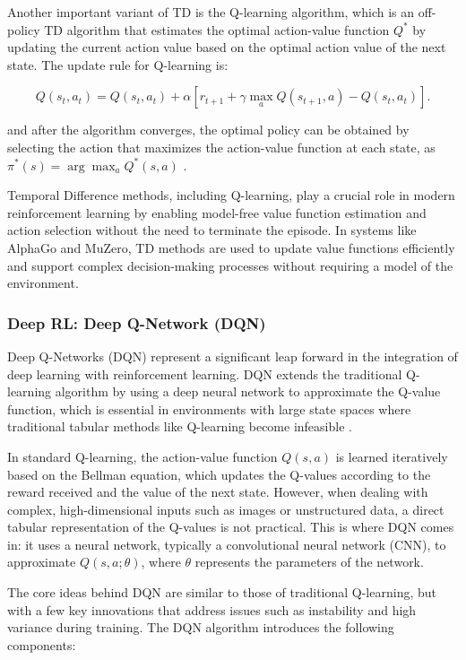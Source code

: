 Another important variant of TD is the Q-learning algorithm, which is an
off-policy TD algorithm that estimates the optimal action-value function $Q^*$
by updating the current action value based on the optimal action value of the
next state. The update rule for Q-learning is:

\begin{equation}
    Q(s_t, a_t) = Q(s_t, a_t) + \alpha[r_{t+1} + \gamma \max_a Q(s_{t+1}, a) - Q(s_t, a_t)] .
\end{equation}

and after the algorithm converges, the optimal policy can be obtained by
selecting the action that maximizes the action-value function at each state, as
$\pi^*(s) = \arg\max_a Q^*(s, a)$ \cite{bg2}.

Temporal Difference methods, including Q-learning, play a crucial role in
modern reinforcement learning by enabling model-free value function estimation
and action selection without the need to terminate the episode. In systems like
AlphaGo and MuZero, TD methods are used to update value functions efficiently
and support complex decision-making processes without requiring a model of the
environment\cite{bg2}.

\subsubsection{\textbf{Deep RL: Deep Q-Network (DQN)}}

Deep Q-Networks (DQN) represent a significant leap forward in the integration
of deep learning with reinforcement learning. DQN extends the traditional
Q-learning algorithm by using a deep neural network to approximate the Q-value
function, which is essential in environments with large state spaces where
traditional tabular methods like Q-learning become infeasible \cite{bg3}.

In standard Q-learning, the action-value function \(Q(s, a)\) is learned
iteratively based on the Bellman equation, which updates the Q-values according
to the reward received and the value of the next state. However, when dealing
with complex, high-dimensional inputs such as images or unstructured data, a
direct tabular representation of the Q-values is not practical. This is where
DQN comes in: it uses a neural network, typically a convolutional neural
network (CNN), to approximate \(Q(s, a; \theta)\), where \(\theta\) represents
the parameters of the network.

The core ideas behind DQN are similar to those of traditional Q-learning, but
with a few key innovations that address issues such as instability and high
variance during training. The DQN algorithm introduces the following
components:

